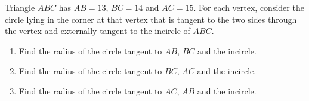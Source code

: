 Triangle $ABC$ has $AB=13$, $BC=14$ and $AC=15$. For each vertex, consider the circle lying in the corner at that vertex that is tangent to the two sides through the vertex and externally tangent to the incircle of $ABC$.
\begin{enumerate}
\item[(a)] Find the radius of the circle tangent to $AB$, $BC$ and the incircle.
\item[(b)] Find the radius of the circle tangent to $BC$, $AC$ and the incircle.
\item[(c)] Find the radius of the circle tangent to $AC$, $AB$ and the incircle.
\end{enumerate}
